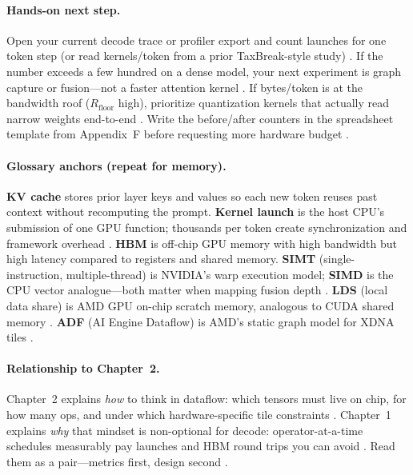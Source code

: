 \paragraph{Hands-on next step.}
Open your current decode trace or profiler export and count launches for one token step (or read kernels/token from a prior TaxBreak-style study) \citep{taxbreak2026}.
If the number exceeds a few hundred on a dense model, your next experiment is graph capture or fusion---not a faster attention kernel \citep{nvidia2024cudagraphs,yirage2026}.
If bytes/token is at the bandwidth roof ($R_{\mathrm{floor}}$ high), prioritize quantization kernels that actually read narrow weights end-to-end \citep{memoryfloor2026}.
Write the before/after counters in the spreadsheet template from Appendix~F before requesting more hardware budget \citep{taxbreak2026,memoryfloor2026}.

\paragraph{Glossary anchors (repeat for memory).}
\textbf{KV cache} stores prior layer keys and values so each new token reuses past context without recomputing the prompt.
\textbf{Kernel launch} is the host CPU's submission of one GPU function; thousands per token create synchronization and framework overhead \citep{taxbreak2026}.
\textbf{HBM} is off-chip GPU memory with high bandwidth but high latency compared to registers and shared memory.
\textbf{SIMT} (single-instruction, multiple-thread) is NVIDIA's warp execution model; \textbf{SIMD} is the CPU vector analogue---both matter when mapping fusion depth \citep{semianalysis2024tma,amd2024xdna}.
\textbf{LDS} (local data share) is AMD GPU on-chip scratch memory, analogous to CUDA shared memory \citep{amd2024aie}.
\textbf{ADF} (AI Engine Dataflow) is AMD's static graph model for XDNA tiles \citep{amd2024xdna}.

\paragraph{Relationship to Chapter~2.}
Chapter~2 explains \emph{how} to think in dataflow: which tensors must live on chip, for how many ops, and under which hardware-specific tile constraints \citep{chen2020compilerbasedhardw,dlbook}.
Chapter~1 explains \emph{why} that mindset is non-optional for decode: operator-at-a-time schedules measurably pay launches and HBM round trips you can avoid \citep{taxbreak2026,memoryfloor2026}.
Read them as a pair---metrics first, design second \citep{yirage2026}.

